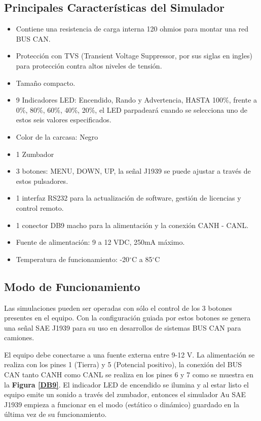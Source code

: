 \subsection {Principales Características del Simulador}

\begin{itemize}

\item Contiene una resistencia de carga interna 120 ohmios para montar una red BUS CAN.
\item Protección con  TVS (Transient Voltage Suppressor, por sus siglas en ingles) para protección contra altos niveles de tensión. 
\item Tamaño compacto.
\item 9 Indicadores LED: Encendido, Rando y Advertencia, HASTA 100\%, frente a 0\%, 80\%, 60\%, 40\%, 20\%, el  LED parpadeará cuando se selecciona uno de estos seis valores especificados.
\item Color de la carcasa: Negro 
\item 1 Zumbador
\item 3 botones: MENU, DOWN, UP, la señal J1939 se puede ajustar a través de estos pulsadores.
\item 1 interfaz RS232 para la actualización de software, gestión de licencias y control remoto.
\item 1 conector DB9 macho para la alimentación y la conexión CANH - CANL.
\item Fuente de alimentación: 9 a 12 VDC, 250mA máximo.
\item Temperatura de funcionamiento: -20$^{\circ}$C a 85$^{\circ}$C

\end{itemize}

\subsection{Modo de Funcionamiento}

Las simulaciones pueden ser operadas con sólo el control de los 3 botones presentes en el equipo. Con la configuración guiada por estos botones se genera una señal SAE J1939 para su uso en desarrollos de sistemas BUS CAN para camiones.

El equipo debe conectarse a una fuente externa entre 9-12 V. La alimentación se realiza con los pines 1 (Tierra) y 5 (Potencial positivo), la conexión del BUS CAN tanto CANH como CANL se realiza en los pines 6 y 7 como se muestra en la \textbf{Figura \ref{DB9}}.  El indicador LED de encendido se ilumina y al estar listo el equipo emite un sonido a través del zumbador, entonces el simulador Au SAE J1939 empieza a funcionar en el modo (estático o dinámico) guardado en la última vez de su funcionamiento.

